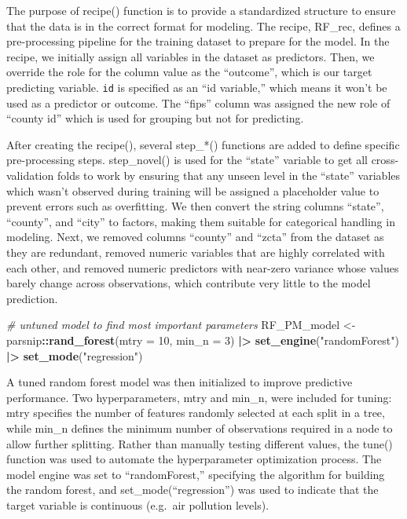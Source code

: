 \documentclass[
]{article}
\newenvironment{Shaded}{\begin{snugshade}}{\end{snugshade}}
\newcommand{\AttributeTok}[1]{\textcolor[rgb]{0.13,0.29,0.53}{#1}}
\newcommand{\CommentTok}[1]{\textcolor[rgb]{0.56,0.35,0.01}{\textit{#1}}}
\newcommand{\DecValTok}[1]{\textcolor[rgb]{0.00,0.00,0.81}{#1}}
\newcommand{\FunctionTok}[1]{\textcolor[rgb]{0.13,0.29,0.53}{\textbf{#1}}}
\newcommand{\NormalTok}[1]{#1}
\newcommand{\OtherTok}[1]{\textcolor[rgb]{0.56,0.35,0.01}{#1}}
\newcommand{\SpecialCharTok}[1]{\textcolor[rgb]{0.81,0.36,0.00}{\textbf{#1}}}
\newcommand{\StringTok}[1]{\textcolor[rgb]{0.31,0.60,0.02}{#1}}
\begin{document}
The purpose of recipe() function is to provide a standardized structure
to ensure that the data is in the correct format for modeling. The
recipe, RF\_rec, defines a pre-processing pipeline for the training
dataset to prepare for the model. In the recipe, we initially assign all
variables in the dataset as predictors. Then, we override the role for
the column value as the ``outcome'', which is our target predicting
variable. \texttt{id} is specified as an ``id variable,'' which means it
won't be used as a predictor or outcome. The ``fips'' column was
assigned the new role of ``county id'' which is used for grouping but
not for predicting.

After creating the recipe(), several step\_*() functions are added to
define specific pre-processing steps. step\_novel() is used for the
``state'' variable to get all cross-validation folds to work by ensuring
that any unseen level in the ``state'' variables which wasn't observed
during training will be assigned a placeholder value to prevent errors
such as overfitting. We then convert the string columns ``state'',
``county'', and ``city'' to factors, making them suitable for
categorical handling in modeling. Next, we removed columns ``county''
and ``zcta'' from the dataset as they are redundant, removed numeric
variables that are highly correlated with each other, and removed
numeric predictors with near-zero variance whose values barely change
across observations, which contribute very little to the model
prediction.

\begin{Shaded}
\begin{Highlighting}[]
\CommentTok{\# untuned model to find most important parameters}
\NormalTok{RF\_PM\_model }\OtherTok{\textless{}{-}}\NormalTok{ parsnip}\SpecialCharTok{::}\FunctionTok{rand\_forest}\NormalTok{(}\AttributeTok{mtry =} \DecValTok{10}\NormalTok{, }\AttributeTok{min\_n =} \DecValTok{3}\NormalTok{) }\SpecialCharTok{|\textgreater{}} 
  \FunctionTok{set\_engine}\NormalTok{(}\StringTok{"randomForest"}\NormalTok{) }\SpecialCharTok{|\textgreater{}}
  \FunctionTok{set\_mode}\NormalTok{(}\StringTok{"regression"}\NormalTok{)}
\end{Highlighting}
\end{Shaded}

A tuned random forest model was then initialized to improve predictive
performance. Two hyperparameters, mtry and min\_n, were included for
tuning: mtry specifies the number of features randomly selected at each
split in a tree, while min\_n defines the minimum number of observations
required in a node to allow further splitting. Rather than manually
testing different values, the tune() function was used to automate the
hyperparameter optimization process. The model engine was set to
``randomForest,'' specifying the algorithm for building the random
forest, and set\_mode(``regression'') was used to indicate that the
target variable is continuous (e.g.~air pollution levels).
\end{document}
